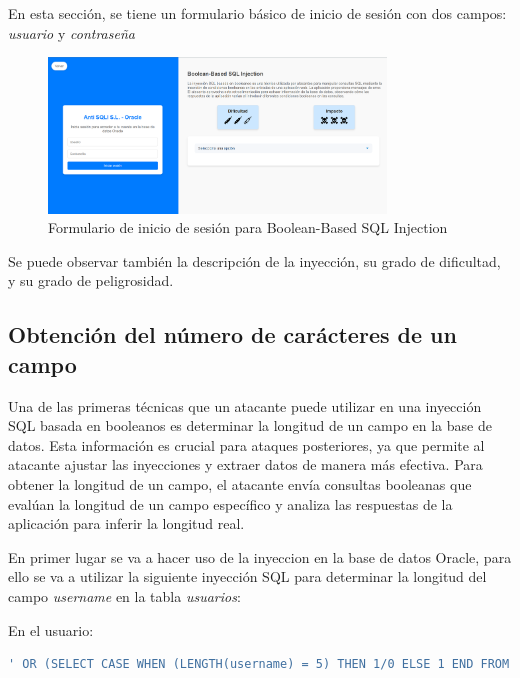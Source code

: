 \documentclass[a4paper,12pt]{article}
\begin{document}
En esta sección, se tiene un formulario básico de inicio de sesión con dos campos: \textit{usuario} y \textit{contraseña}

\begin{figure}[H]
    \centering
    \includegraphics[width=0.8\textwidth]{Imagenes/BooleanSQLILab.png}
    \caption{Formulario de inicio de sesión para Boolean-Based SQL Injection}
\end{figure}

Se puede observar también la descripción de la inyección, su grado de dificultad, y su grado de peligrosidad.


\subsection{Obtención del número de carácteres de un campo}

Una de las primeras técnicas que un atacante puede utilizar en una inyección SQL basada en booleanos es determinar la longitud de un campo en la base de datos. Esta información es crucial para ataques posteriores, ya que permite al atacante ajustar las inyecciones y extraer datos de manera más efectiva. Para obtener la longitud de un campo, el atacante envía consultas booleanas que evalúan la longitud de un campo específico y analiza las respuestas de la aplicación para inferir la longitud real.

\vspace{0,5cm}

En primer lugar se va a hacer uso de la inyeccion en la base de datos Oracle, para ello se va a utilizar la siguiente inyección SQL para determinar la longitud del campo \textit{username} en la tabla \textit{usuarios}:

\vspace{0,5cm}

En el usuario:

\begin{lstlisting}[language=SQL]
' OR (SELECT CASE WHEN (LENGTH(username) = 5) THEN 1/0 ELSE 1 END FROM (SELECT username, ROWNUM AS rn FROM Usuarios) WHERE rn=1) = 1 --
\end{lstlisting}
\vspace{0,5cm}
\end{document}
